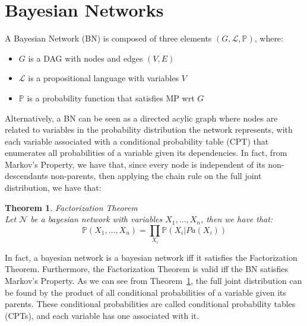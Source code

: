 \documentclass{amsart}
\theoremstyle{plain}
\newtheorem{theorem}{Theorem}
\newcommand{\pr}{\mathbb{P}}
\begin{document}
\section{Bayesian Networks}

A Bayesian Network (BN) is composed of three elements $(G, \mathcal{L}, \pr)$, where:

\begin{itemize}
  \item $G$ is a DAG with nodes and edges $(V,E)$
  \item $\mathcal{L}$ is a propositional language with variables $V$
  \item $\pr$ is a probability function that satisfies MP wrt $G$
\end{itemize}

Alternatively, a BN can be seen as a directed acylic graph where nodes are related to variables in
the probability distribution the network represents, with each variable associated with a
conditional probability table (CPT) that enumerates all probabilities of a variable given its
dependencies. In fact, from Markov's Property, we have that, since every node is independent of its
non-descendants non-parents, then applying the chain rule on the full joint distribution, we have
that:

\begin{theorem} Factorization Theorem~\label{factor-thm}\\
  Let $\mathcal{N}$ be a bayesian network with variables $X_1,\ldots,X_n$, then we have that:
  \begin{equation*}
    \pr(X_1,\ldots,X_n) = \prod_{X_i} \pr(X_i|Pa(X_i))
  \end{equation*}
\end{theorem}

In fact, a bayesian network is a bayesian network iff it satisfies the Factorization Theorem.
Furthermore, the Factorization Theorem is valid iff the BN satisfies Markov's Property. As we can
see from Theorem~\ref{factor-thm}, the full joint distribution can be found by the product of all
conditional probabilities of a variable given its parents. These conditional probabilities are
called conditional probability tables (CPTs), and each variable has one associated with it.

\begin{table}[h]
\end{table}
\end{document}
